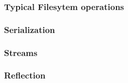\begin{frame}
	\frametitle{The Filesystem \& Game Engines}
	\begin(itemize)
	\end{itemize)
\end{frame}

\begin{frame}
	\frametitle{Typical Filesytem operations}
\end{frame}

\begin{frame}
	\frametitle{Serialization}
\end{frame}

\begin{frame}
	\frametitle{Streams}
\end{frame}

\begin{frame}
	\frametitle{Reflection}
\end{frame}


